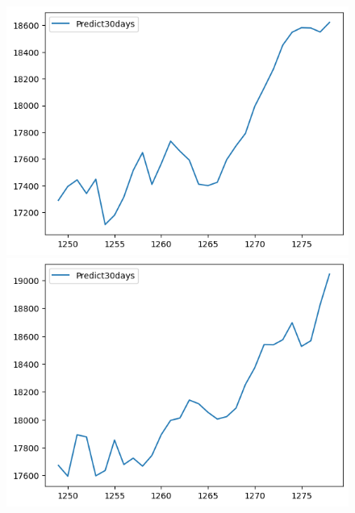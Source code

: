 \begin{figure}[H]
\begin{minipage}{0.15\textwidth}
    \includegraphics[width=1\textwidth]{resources/chapter-5/predicted/EIB_NBeats_7-3_30days.png}
    \end{minipage}
    \hfill
    \begin{minipage}{0.15\textwidth}
    \centering
    \includegraphics[width=1\textwidth]{resources/chapter-5/predicted/EIB_NBeats_8-2_30days.png}
    \end{minipage}
    \hfill
        \begin{minipage}{0.15\textwidth}
    \centering

\end{minipage}
\end{figure}
